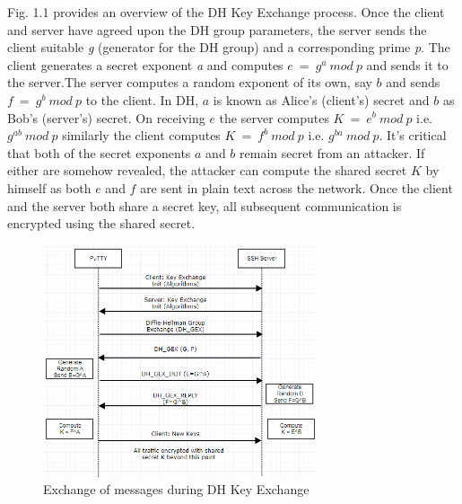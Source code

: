 \documentclass{report}
\begin{document}
Fig. 1.1 provides an overview of the DH Key Exchange process. Once the client and server have agreed upon the DH group parameters, the server sends the client suitable \textit{g} (generator for the DH group) and a corresponding prime \textit{p}. The client generates a secret exponent \textit{a} and computes \(e\ = \ g^a\ mod\ p\) and sends it to the server.The server computes a random exponent of its own, say \(b\) and sends \(f\ =\ g^b\ mod\ p\) to the client. In DH, \(a\) is known as Alice's (client's) secret and \(b\) as Bob's (server's) secret. On receiving \(e\) the server computes \(K\ =\ e^b\ mod\ p\)  i.e. \(g^{ab} \ mod\ p\) similarly the client computes \(K\ =\ f^b\ mod\ p\) i.e. \(g^{ba}\ mod\ p\). It's critical that both of the secret exponents \(a\) and \(b\) remain secret from an attacker. If either are somehow revealed, the attacker can compute the shared secret \(K\) by himself as both \(e\) and \(f\) are sent in plain text across the network. Once the client and the server both share a secret key, all subsequent communication is encrypted using the shared secret.
\begin{figure}[ht]
\caption{Exchange of messages during DH Key Exchange}
\centering
\includegraphics[width=0.72\textwidth]{SSH_DH_KEX.png}
\end{figure}
\end{document}
